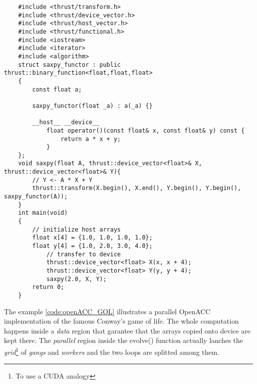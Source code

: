     \begin{lstlisting}
	#include <thrust/transform.h>
	#include <thrust/device_vector.h>
	#include <thrust/host_vector.h>
	#include <thrust/functional.h>
	#include <iostream>
	#include <iterator>
	#include <algorithm>
	struct saxpy_functor : public thrust::binary_function<float,float,float>
	{
	    const float a;
	
	    saxpy_functor(float _a) : a(_a) {}
	
	    __host__ __device__
	        float operator()(const float& x, const float& y) const {
	            return a * x + y;
	        }
	};
	void saxpy(float A, thrust::device_vector<float>& X, thrust::device_vector<float>& Y){
	    // Y <- A * X + Y
	    thrust::transform(X.begin(), X.end(), Y.begin(), Y.begin(), saxpy_functor(A));
	}
	int main(void)
	{
	    // initialize host arrays
	    float x[4] = {1.0, 1.0, 1.0, 1.0};
	    float y[4] = {1.0, 2.0, 3.0, 4.0};
	        // transfer to device
	        thrust::device_vector<float> X(x, x + 4);
	        thrust::device_vector<float> Y(y, y + 4);
	        saxpy(2.0, X, Y);
	    return 0;
	}
    \end{lstlisting} 
    
    
    
    
    
         The example \ref{code:openACC_GOL} illustrates a
         parallel OpenACC implementation of the famous
         Conway's game of life.
         The whole computation happens inside a \emph{data} region that garantee
         that the arrays copied onto device are kept there.
         The \emph{parallel} region inside the  evolve() function actually
         lanches the \emph{grid}\footnote{To use a CUDA analogy} of
        \emph{gangs} and \emph{workers} and the two loops are splitted among
        them.
	  
